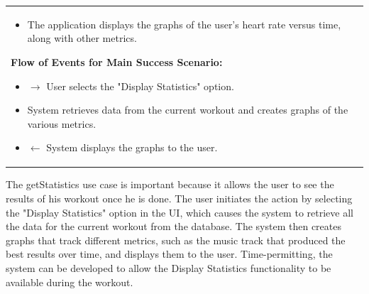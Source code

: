 \documentclass[letterpaper,english, 12pt]{scrreprt}
\begin{document}
\begin{center}
\begin{tabular}{|C{15cm}|}
\begin{itemize}
                                        \item The application displays the graphs of the user's heart rate versus time, along with other metrics.
                                \end{itemize}
                        \begin{flushleft}
                                \textbf{Flow of Events for Main Success Scenario: }
                        \end{flushleft}
                                \begin{itemize}
                                        \item $\rightarrow$ User selects the "Display Statistics" option.
                                        \item System retrieves data from the current workout and creates graphs of the various metrics.
                                        \item $\leftarrow$ System displays the graphs to the user.
                                \end{itemize}
                \hline
        \end{tabular}
\end{center}

The getStatistics use case is important because it allows the user to see the results of his workout once he is done. The user initiates the action by selecting the "Display Statistics" option in the UI, which causes the system to retrieve all the data for the current workout from the database. The system then creates graphs that track different metrics, such as the music track that produced the best results over time, and displays them to the user. Time-permitting, the system can be developed to allow the Display Statistics functionality to be available during the workout.
\end{document}

